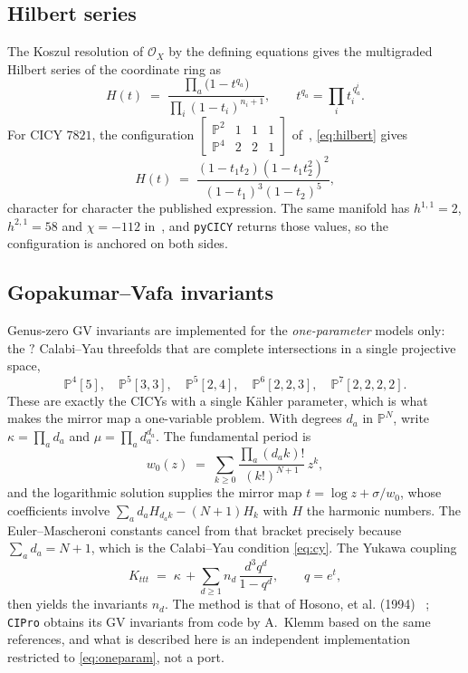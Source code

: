\documentclass[11pt,a4paper]{article}
\newcommand{\FactGVModels}{?}\newcommand{\FactGVMaxDegree}{?}
\newcommand{\PP}{\mathbb{P}}
\newcommand{\cO}{\mathcal{O}}
\theoremstyle{definition}
\begin{document}
\subsection{Hilbert series}

The Koszul resolution of $\cO_X$ by the defining equations gives the
multigraded Hilbert series of the coordinate ring as
%
\begin{equation}
H(t) \;=\;
\frac{\prod_a \bigl(1 - t^{q_a}\bigr)}{\prod_i (1-t_i)^{n_i+1}},
\qquad t^{q_a} = \prod_i t_i^{\,q^i_a} .
\label{eq:hilbert}
\end{equation}
%
For CICY $7821$, the configuration
$\left[\begin{smallmatrix}\PP^2 & 1&1&1\\ \PP^4 & 2&2&1\end{smallmatrix}
\right]$ of~\cite{Anderson2026}, \cref{eq:hilbert} gives
%
\begin{equation}
H(t) \;=\; \frac{(1-t_1t_2)(1-t_1t_2^2)^2}{(1-t_1)^3(1-t_2)^5},
\label{eq:hs7821}
\end{equation}
%
character for character the published expression. The same manifold has
$h^{1,1}=2$, $h^{2,1}=58$ and $\chi=-112$ in~\cite{Anderson2026}, and
\texttt{pyCICY} returns those values, so the configuration is anchored on
both sides.

\subsection{Gopakumar--Vafa invariants}
\label{sec:gv}
\label{sec:gv}

Genus-zero GV invariants are implemented for the \emph{one-parameter} models
only: the $\FactGVModels$ Calabi--Yau threefolds that are complete
intersections in a single projective space,
%
\begin{equation}
\PP^4[5],\quad \PP^5[3,3],\quad \PP^5[2,4],\quad \PP^6[2,2,3],\quad
\PP^7[2,2,2,2] .
\label{eq:oneparam}
\end{equation}
%
These are exactly the CICYs with a single K\"ahler parameter, which is what
makes the mirror map a one-variable problem. With degrees $d_a$ in $\PP^N$,
write $\kappa = \prod_a d_a$ and $\mu = \prod_a d_a^{d_a}$. The fundamental
period is
%
\begin{equation}
w_0(z) \;=\; \sum_{k\ge 0}
\frac{\prod_a (d_a k)!}{(k!)^{N+1}}\, z^k ,
\label{eq:period}
\end{equation}
%
and the logarithmic solution supplies the mirror map $t = \log z +
\sigma/w_0$, whose coefficients involve
$\sum_a d_a H_{d_a k} - (N+1) H_k$ with $H$ the harmonic numbers. The
Euler--Mascheroni constants cancel from that bracket precisely because
$\sum_a d_a = N+1$, which is the Calabi--Yau condition \cref{eq:cy}. The
Yukawa coupling
%
\begin{equation}
K_{ttt} \;=\; \kappa \, + \sum_{d \ge 1} n_d\, \frac{d^3 q^d}{1-q^d},
\qquad q = e^{t},
\label{eq:yukawa}
\end{equation}
%
then yields the invariants $n_d$. The method is that
of Hosono, et al. (1994) ~\cite{HKTY1994}; \texttt{CIPro} obtains its GV invariants from
code by A.~Klemm based on the same references, and what is described here is
an independent implementation restricted to \cref{eq:oneparam}, not a port.
\end{document}
